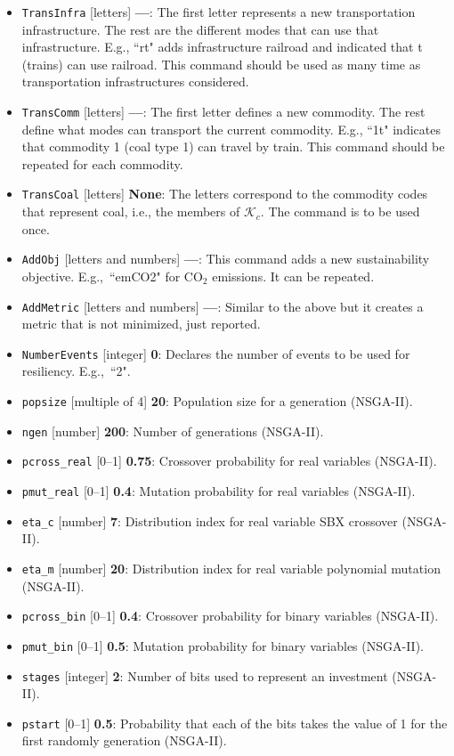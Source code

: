\documentclass{article}
\begin{document}
\begin{itemize}
  \item \verb=TransInfra= [letters] \textbf{---}: The first letter represents a new transportation infrastructure. The rest are the different modes that can use that infrastructure. E.g., ``rt" adds infrastructure railroad and indicated that t (trains) can use railroad. This command should be used as many time as transportation infrastructures considered.
  \item \verb=TransComm= [letters] \textbf{---}: The first letter defines a new commodity. The rest define what modes can transport the current commodity. E.g., ``1t" indicates that commodity 1 (coal type 1) can travel by train. This command should be repeated for each commodity.
  \item \verb=TransCoal= [letters] \textbf{None}: The letters correspond to the commodity codes that represent coal, i.e., the members of $\mathcal{K}_c$. The command is to be used once.
  \item \verb=AddObj= [letters and numbers] \textbf{---}: This command adds a new sustainability objective. E.g.,~``emCO2" for CO$_2$ emissions. It can be repeated.
  \item \verb=AddMetric= [letters and numbers] \textbf{---}: Similar to the above but it creates a metric that is not minimized, just reported.
  \item \verb=NumberEvents= [integer] \textbf{0}: Declares the number of events to be used for resiliency. E.g.,~``2".
  \item \verb=popsize= [multiple of 4] \textbf{20}: Population size for a generation (NSGA-II).
  \item \verb=ngen= [number] \textbf{200}: Number of generations (NSGA-II).
  \item \verb=pcross_real= [0--1] \textbf{0.75}:  Crossover probability for real variables (NSGA-II).
  \item \verb=pmut_real= [0--1] \textbf{0.4}:  Mutation probability for real variables (NSGA-II).
  \item \verb=eta_c= [number] \textbf{7}:  Distribution index for real variable SBX crossover (NSGA-II).
  \item \verb=eta_m= [number] \textbf{20}:  Distribution index for real variable polynomial mutation (NSGA-II).
  \item \verb=pcross_bin= [0--1] \textbf{0.4}:  Crossover probability for binary variables (NSGA-II).
  \item \verb=pmut_bin= [0--1] \textbf{0.5}:  Mutation probability for binary variables (NSGA-II).
  \item \verb=stages= [integer] \textbf{2}:  Number of bits used to represent an investment (NSGA-II).
  \item \verb=pstart= [0--1] \textbf{0.5}:  Probability that each of the bits takes the value of 1 for the first randomly generation (NSGA-II).
\end{itemize}
\end{document}
